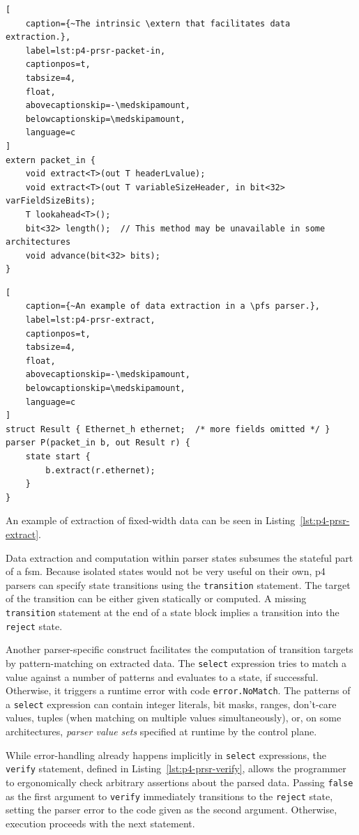 \begin{lstlisting}[
	caption={~The intrinsic \extern that facilitates data extraction.},
	label=lst:p4-prsr-packet-in,
	captionpos=t,
	tabsize=4,
	float,
	abovecaptionskip=-\medskipamount,
	belowcaptionskip=\medskipamount,
	language=c
]
extern packet_in {
	void extract<T>(out T headerLvalue);
	void extract<T>(out T variableSizeHeader, in bit<32> varFieldSizeBits);
	T lookahead<T>();
	bit<32> length();  // This method may be unavailable in some architectures
	void advance(bit<32> bits);
}
\end{lstlisting}

\begin{lstlisting}[
	caption={~An example of data extraction in a \pfs parser.},
	label=lst:p4-prsr-extract,
	captionpos=t,
	tabsize=4,
	float,
	abovecaptionskip=-\medskipamount,
	belowcaptionskip=\medskipamount,
	language=c
]
struct Result { Ethernet_h ethernet;  /* more fields omitted */ }
parser P(packet_in b, out Result r) {
	state start {
		b.extract(r.ethernet);
	}
}
\end{lstlisting}

An example of extraction of fixed-width data can be seen in
Listing~\ref{lst:p4-prsr-extract}.

Data extraction and computation within parser states subsumes the stateful part
of a \acrlong{fsm}. Because isolated states would not be very useful on their
own, \acrshort{p4} parsers can specify state transitions using the
\texttt{transition} statement. The target of the transition can be either given
statically or computed. A missing \texttt{transition} statement at the end of a
state block implies a transition into the \texttt{reject} state.

Another parser-specific construct facilitates the computation of transition
targets by pattern-matching on extracted data. The \texttt{select} expression
tries to match a value against a number of patterns and evaluates to a state, if
successful. Otherwise, it triggers a runtime error with code
\texttt{error.NoMatch}. The patterns of a \texttt{select} expression can contain
integer literals, bit masks, ranges, don't-care values, tuples (when matching on
multiple values simultaneously), or, on some architectures, \textit{parser value
sets} specified at runtime by the control plane.

While error-handling already happens implicitly in \texttt{select} expressions,
the \texttt{verify} statement, defined in Listing~\ref{lst:p4-prsr-verify},
allows the programmer to ergonomically check arbitrary assertions about the
parsed data. Passing \texttt{false} as the first argument to \texttt{verify}
immediately transitions to the \texttt{reject} state, setting the parser error
to the code given as the second argument. Otherwise, execution proceeds with the
next statement.

